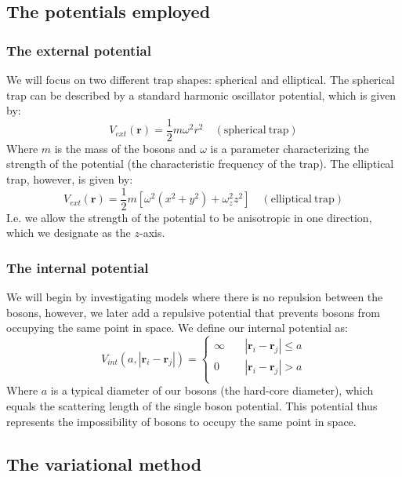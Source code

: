 \documentclass[a4paper, 10pt]{article}
\begin{document}
	\subsection{The potentials employed}
	\subsubsection{The external potential}
	We will focus on two different trap shapes: spherical and elliptical. The spherical trap can be described by a standard harmonic oscillator potential, which is given by:
	\begin{equation}
	V_{ext}(\boldsymbol{r})=\frac{1}{2}m\omega^2 r^2 \quad \mathrm{(spherical\  trap)}
	\end{equation}
	Where $m$ is the mass of the bosons and $\omega$ is a parameter characterizing the strength of the potential (the characteristic frequency of the trap). The elliptical trap, however, is given by:
	\begin{equation}
	V_{ext}(\boldsymbol{r})=\frac{1}{2}m[\omega^2 (x^2+y^2)+\omega_z^2 z^2] \quad \mathrm{(elliptical\  trap)}
	\end{equation}
	I.e. we allow the strength of the potential to be anisotropic in one direction, which we designate as the $z$-axis.
	\subsubsection{The internal potential}
	We will begin by investigating models where there is no repulsion between the bosons, however, we later add a repulsive potential that prevents bosons from occupying the same point in space. We define our internal potential as:
	\begin{equation}
	V_{int}(a,|\boldsymbol{r}_i-\boldsymbol{r}_j|)= 
	\begin{cases}
	\infty & \quad |\boldsymbol{r}_i-\boldsymbol{r}_j| \leq  a\\
	0 & \quad |\boldsymbol{r}_i-\boldsymbol{r}_j|>  a\\
	\end{cases}
	\end{equation}
	Where $a$ is a typical diameter of our bosons (the hard-core diameter), which equals the scattering length of the single boson potential.
	This potential thus represents the impossibility of bosons to occupy the same point in space.
	\subsection{The variational method}
\end{document}
